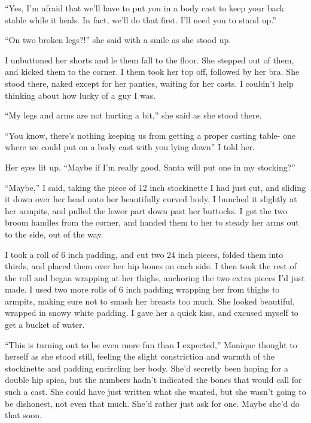 ``Yes, I'm afraid that we'll have to put you in a body cast to keep your back stable while
it heals. In fact, we'll do that first. I'll need you to stand up.''

``On two broken legs?!'' she said with a smile as she stood up.

I unbuttoned her shorts and le them fall to the floor. She stepped out of them, and kicked
them to the corner. I them took her top off, followed by her bra. She stood there, naked except
for her panties, waiting for her casts. I couldn't help thinking about how lucky of a guy I was.

``My legs and arms are not hurting a bit,'' she said as she stood there.

``You know, there's nothing keeping us from getting a proper casting table- one where we
could put on a body cast with you lying down'' I told her.

Her eyes lit up. ``Maybe if I'm really good, Santa will put one in my stocking?''

``Maybe,'' I said, taking the piece of 12 inch stockinette I had just cut, and sliding it
down over her head onto her beautifully curved body. I bunched it slightly at her armpits, and
pulled the lower part down past her buttocks. I got the two broom handles from the corner, and
handed them to her to steady her arms out to the side, out of the way.

I took a roll of 6 inch padding, and cut two 24 inch pieces, folded them into thirds, and
placed them over her hip bones on each side. I then took the rest of the roll and began wrapping
at her thighs, anchoring the two extra pieces I'd just made. I used two more rolls of 6 inch
padding wrapping her from thighs to armpits, making sure not to smash her breasts too much. She
looked beautiful, wrapped in snowy white padding. I gave her a quick kiss, and excused myself to
get a bucket of water.

\begin{thought}
``This is turning out to be even more fun than I expected,'' Monique thought to herself as
she stood still, feeling the slight constriction and warmth of the stockinette and padding
encircling her body. She'd secretly been hoping for a double hip spica, but the numbers hadn't
indicated the bones that would call for such a cast. She could have just written what she
wanted, but she wasn't going to be dishonest, not even that much. She'd rather just ask for one.
Maybe she'd do that soon.
\end{thought}

